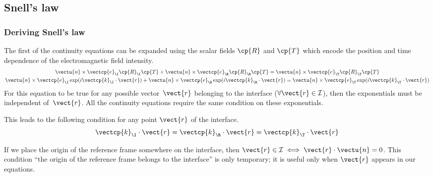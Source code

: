 \subsection{Snell's law}
\label{sec:snells_law}

\subsubsection{Deriving Snell's law}
The first of the continuity equations can be expanded using the scalar fields $\cp{R}$ and $\cp{T}$ which encode the position and time dependence of the electromagnetic field intensity.
\begin{subequations}
    \begin{gather}
        \vectu{n} \times \vectcp{e}_\I \cp{R}_\I \cp{T} +
        \vectu{n} \times \vectcp{e}_\R \cp{R}_\R \cp{T}=
        \vectu{n} \times \vectcp{e}_\T \cp{R}_\T \cp{T}
        \\
        \vectu{n} \times \vectcp{e}_\I \exp(i \vectcp{k}_\I \cdot \vect{r}) +
        \vectu{n} \times \vectcp{e}_\R \exp(i \vectcp{k}_\R \cdot \vect{r}) =
        \vectu{n} \times \vectcp{e}_\T \exp(i \vectcp{k}_\T \cdot \vect{r})
    \end{gather}
\end{subequations}
For this equation to be true for any possible vector~$\vect{r}$ belonging to the interface
($\forall \vect{r} \in \mathcal{I}$), then the exponentials must be independent of~$\vect{r}$.
All the continuity equations require the same condition on these exponentials.

This leads to the following condition for any point $\vect{r}$ of the interface.
\begin{equation}
    \vectcp{k}_\I \cdot \vect{r} =
    \vectcp{k}_\R \cdot \vect{r} =
    \vectcp{k}_\T \cdot \vect{r}
\end{equation}

If we place the origin of the reference frame somewhere on the interface,
then $\vect{r} \in \mathcal{I} \iff \vect{r} \cdot \vectu{n}=0$.
This condition ``the origin of the reference frame belongs to the interface'' is only temporary; it is useful only when $\vect{r}$ appears in our equations.

